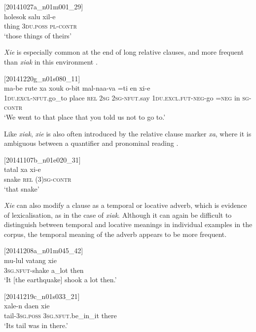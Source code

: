 \documentclass[output=paper,colorlinks,citecolor=brown]{langscibook}
\begin{document}
\ea
{\label{ex:ridge:33}[20141027a\_n01m001\_29]}\\
\gll holesok  salu    xil-e\\
     thing  \textsc{3du.poss}  \textsc{pl-contr}\\
\glt ‘those things of theirs’
\z

\textit{Xie} is especially common at the end of long relative clauses, and more frequent than \textit{xiak} in this environment .

\ea
{\label{ex:ridge:34}[20141220g\_n01s080\_11]}\\
\gll ma-be         {\ob}{\ob}rute   {\ob}xa   xouk       o-bit       mal-naa-va =ti en{\cb}{\cb} xi-e{\cb}\\
     \textsc{1du.excl-nfut}.go\_to     {\db}{\db}place  {\db}\textsc{rel}   \textsc{2sg}     \textsc{2sg-nfut.}say   \textsc{1du.excl.fut-neg}{}-go \textsc{=neg}    in   \textsc{sg-contr}  \\
\glt ‘We went to that place that you told us not to go to.’
\z

Like \textit{xiak}, \textit{xie} is also often introduced by the relative clause marker \textit{xa}, where it is ambiguous between a quantifier and pronominal reading .

\ea
{\label{ex:ridge:35}[20141107b\_n01e020\_31]}\\
\gll tatal  xa  xi-e\\
     snake  \textsc{rel}  \textsc{(3)sg-contr}\\
\glt ‘that snake’
\z

\textit{Xie} can also modify a clause as a temporal  or locative  adverb, which is evidence of lexicalisation, as in the case of \textit{xiak}. Although it can again be difficult to distinguish between temporal and locative meanings in individual examples in the corpus, the temporal meaning of the adverb appears to be more frequent.

\ea
{\label{ex:ridge:36}[20141208a\_n01m045\_42]} \\
\gll mu-lul      vatang  xie\\
     \textsc{3sg.nfut-}shake  a\_lot    then\\
\glt ‘It [the earthquake] shook a lot then.’
\z

\ea
{\label{ex:ridge:37}[20141219c\_n01s033\_21]}\\
\gll xale-n    daen      xie\\
     tail-\textsc{3sg.poss}  \textsc{3sg.nfut.}be\_in\_it  there\\
\glt ‘Its tail was in there.’
\z
\end{document}

